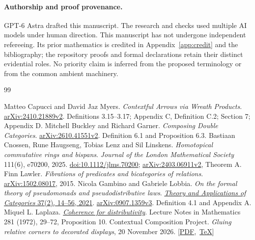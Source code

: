 \documentclass[11pt]{article}
\numberwithin{equation}{section}
\theoremstyle{definition}\newtheorem{definition}[theorem]{Definition}
\begin{document}
\paragraph{Authorship and proof provenance.}
GPT-6 Astra drafted this manuscript. The research and checks used multiple
AI models under human direction. This manuscript has not
undergone independent refereeing. Its prior mathematics is credited
in Appendix~\ref{app:credit} and the bibliography; the repository proofs and
formal declarations retain their distinct evidential roles. No priority
claim is inferred from the proposed terminology or from the common ambient
machinery.
\begin{thebibliography}{99}
\footnotesize\setlength{\baselineskip}{9.7pt}\setlength{\itemsep}{0pt}\setlength{\parsep}{0pt}\raggedright
{} Matteo Capucci and David Jaz Myers.
\emph{Contextful Arrows via Wreath Products}.
\href{https://arxiv.org/pdf/2410.21889v2}{arXiv:2410.21889v2}.
Definitions 3.15--3.17; Appendix C, Definition C.2; Section 7; Appendix D.
 Mitchell Buckley and Richard Garner.
\emph{Composing Double Categories}.
\href{https://arxiv.org/html/2610.41551v2}{arXiv:2610.41551v2}.
Definition 6.1 and Proposition 6.3.
 Bastiaan Cnossen, Rune Haugseng, Tobias Lenz and Sil Linskens.
\emph{Homotopical commutative rings and bispans}.
\emph{Journal of the London Mathematical Society} 111(6), e70200, 2025.
\href{https://doi.org/10.1112/jlms.70200}{doi:10.1112/jlms.70200};
\href{https://arxiv.org/html/2403.06911v2}{arXiv:2403.06911v2}, Theorem A.
 Finn Lawler.
\emph{Fibrations of predicates and bicategories of relations}.
\href{https://arxiv.org/abs/1502.08017}{arXiv:1502.08017}, 2015.
 Nicola Gambino and Gabriele Lobbia.
\emph{On the formal theory of pseudomonads and pseudodistributive laws}.
\href{https://tac.mta.ca/tac/volumes/37/2/37-02abs.html}{\emph{Theory and Applications of Categories} 37(2), 14--56, 2021}.
\href{https://arxiv.org/pdf/0907.1359v3}{arXiv:0907.1359v3}.
Definition 4.1 and Appendix A.
 Miquel L. Laplaza.
\href{https://www.sas.rochester.edu/mth/sites/doug-ravenel/otherpapers/laplaza.pdf}{\emph{Coherence for distributivity}}.
Lecture Notes in Mathematics 281 (1972), 29--72, Proposition 10.
 Contextual Composition Project.
\emph{Gluing relative corners to decorated displays}, 20 November 2026.
\mbox{[\href{https://github.com/eternal-november/eos-research-programmes/blob/a336bd6c661895d9b86827123dd38ebd8ea2a8fa/projects/contextual-composition/interaction/independent-criterion/Relative_Corners_and_Bispans_Theorem.pdf}{PDF}, \href{https://github.com/eternal-november/eos-research-programmes/blob/a336bd6c661895d9b86827123dd38ebd8ea2a8fa/projects/contextual-composition/interaction/independent-criterion/Relative_Corners_and_Bispans_Theorem.tex}{TeX}]}

\end{thebibliography}
\end{document}
